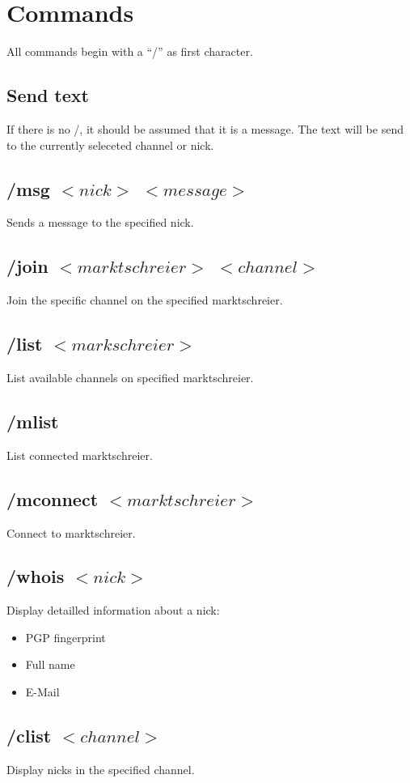 \documentclass[12pt,a4paper]{article}
\begin{document}
\section{Commands}
All commands begin with a "`/"' as first character.

\subsection{Send text}
If there is no /, it should be assumed that it is a message.
The text will be send to the currently seleceted channel or nick.

\subsection{/msg $<nick>$ $<message>$}
Sends a message to the specified nick.

\subsection{/join $<marktschreier>$ $<channel>$}
Join the specific channel on the specified marktschreier.

\subsection{/list $<markschreier>$}
List available channels on specified marktschreier.

\subsection{/mlist}
List connected marktschreier.

\subsection{/mconnect $<marktschreier>$}
Connect to marktschreier.

\subsection{/whois $<nick>$}
Display detailled information about a nick:
\begin{itemize}
\item PGP fingerprint
\item Full name
\item E-Mail
\end{itemize}

\subsection{/clist $<channel>$}
Display nicks in the specified channel.
\end{document}
